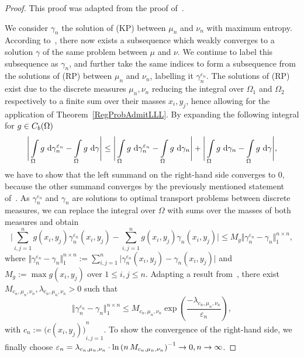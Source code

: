 \begin{proof}
	This proof was adapted from the proof of\ \cite[Theorem~1]{Seg2018}.

	We consider $\gamma_n$ the solution of (KP) between $\mu_n$ and $\nu_n$ with maximum entropy. According to\ \cite[Theorem~5.20]{Vill2009}, there now exists a subsequence which weakly converges to a solution $\gamma$ of the same problem between $\mu$ and $\nu$. We continue to label this subsequence as $\gamma_n$, and further take the same indices to form a subsequence from the solutions of (RP) between $\mu_n$ and $\nu_n$, labelling it $\gamma_n^{\varepsilon_n}$. The solutions of (RP) exist due to the discrete measures $\mu_n, \nu_n$ reducing the integral over $\Omega_1$ and $\Omega_2$ respectively to a finite sum over their masses $x_i, y_j$, hence allowing for the application of Theorem~\ref{RegProbAdmitLLL}. By expanding the following integral for $g \in \CF[b]{\Omega}$
	\[ \Bigg\lvert \int\limits_{\Omega} g~\D[\gamma_n^{\varepsilon_n}] - \int\limits_{\Omega} g~\D[\gamma] \Bigg\rvert \le \Bigg\lvert \int\limits_{\Omega} g~\D[\gamma_n^{\varepsilon_n}] - \int\limits_{\Omega} g~\D[\gamma_n] \Bigg\rvert + \Bigg\lvert \int\limits_{\Omega} g~\D[\gamma_n] - \int\limits_{\Omega} g~\D[\gamma] \Bigg\rvert, \]
	we have to show that the left summand on the right-hand side converges to $0$, because the other summand converges by the previously mentioned statement of\ \cite{Vill2009}. As $\gamma_n^{\varepsilon_n}$ and $\gamma_n$ are solutions to optimal transport problems between discrete measures, we can replace the integral over $\Omega$ with sums over the masses of both measures and obtain
	\[ \Bigg\lvert \sum\limits_{i, j = 1}^n g(x_i, y_j) \gamma_n^{\varepsilon_n}(x_i, y_j) - \sum\limits_{i, j = 1}^n g(x_i, y_j) \gamma_n(x_i, y_j) \Bigg\rvert \le M_g \Vert \gamma_n^{\varepsilon_n} - \gamma_n \Vert_{1}^{n \times n}, \]
	where $\Vert \gamma_n^{\varepsilon_n} - \gamma_n \Vert_{1}^{n \times n} := \sum\limits_{i, j = 1}^n \big\lvert \gamma_n^{\varepsilon_n}(x_i, y_j) - \gamma_n(x_i, y_j) \big\rvert$ and $M_g := \max g(x_i, y_j)$ over $1 \le i, j \le n$. Adapting a result from\ \cite[specifically Equation~2 in the proof of Proposition~3.1]{Comi1994}, there exist $M_{c_n, \mu_n, \nu_n}, \lambda_{c_n, \mu_n, \nu_n} > 0$ such that
	\[ \Vert \gamma_n^{\varepsilon_n} - \gamma_n \Vert_1^{n \times n} \le M_{c_n, \mu_n, \nu_n} \exp\left( \frac{-\lambda_{c_n, \mu_n, \nu_n}}{\varepsilon_n} \right), \]
	with $c_n := {\big( c(x_i, y_j) \big)}_{i, j = 1}^n$. To show the convergence of the right-hand side, we finally choose $\varepsilon_n = \lambda_{c_n, \mu_n, \nu_n} \cdot {\ln\left( n\,M_{c_n, \mu_n, \nu_n} \right)}^{-1} \rightarrow 0, \Ninf$.
\end{proof}

